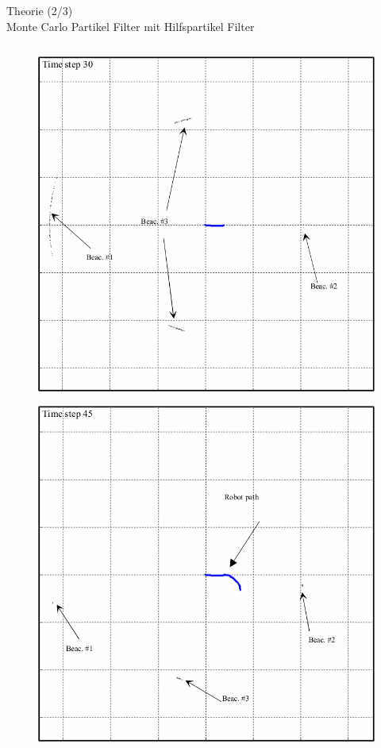 \documentclass{beamer}
\begin{document}
\begin{frame}{Theorie (2/3)\\\normalsize{Monte Carlo Partikel Filter mit Hilfspartikel Filter}}
\begin{columns}
\begin{overlayarea}{\textwidth}{.7\textheight}
{\begin{figure}
						\caption{\cite{blanco2008pure}}
					\end{figure}
				}
				{
					\begin{figure}
						\centering
						\includegraphics[width=\linewidth]{blanco2008pure_fig3g}
						\caption{\cite{blanco2008pure}}
					\end{figure}
				}
				{
					\begin{figure}
						\centering
						\includegraphics[width=\linewidth]{blanco2008pure_fig3h}

\end{figure}}
\end{overlayarea}
\end{columns}
\end{frame}
\end{document}
